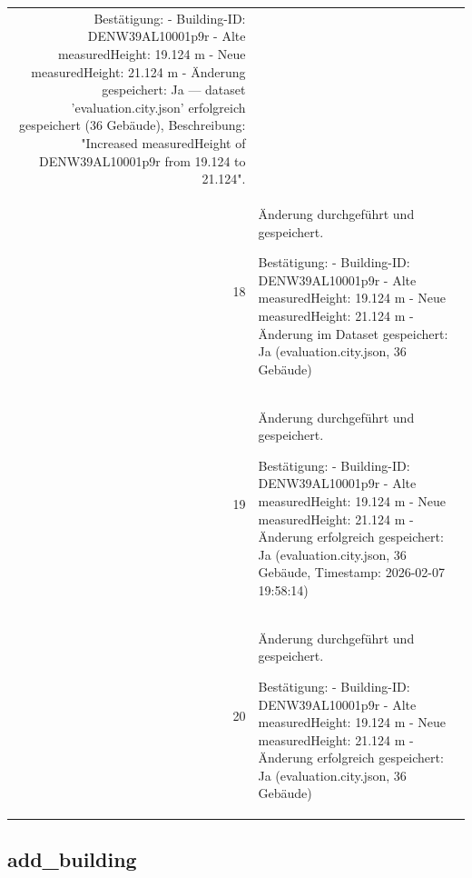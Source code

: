 \documentclass[a4paper,11pt]{article}
\begin{document}
\begin{table}[ht]
\begin{tabular}{r p{12cm}}
Bestätigung:
- Building-ID: DENW39AL10001p9r
- Alte measuredHeight: 19.124 m
- Neue measuredHeight: 21.124 m
- Änderung gespeichert: Ja — dataset 'evaluation.city.json' erfolgreich gespeichert (36 Gebäude), Beschreibung: "Increased measuredHeight of DENW39AL10001p9r from 19.124 to 21.124". \\
18 & Änderung durchgeführt und gespeichert.

Bestätigung:
- Building-ID: DENW39AL10001p9r
- Alte measuredHeight: 19.124 m
- Neue measuredHeight: 21.124 m
- Änderung im Dataset gespeichert: Ja (evaluation.city.json, 36 Gebäude) \\
19 & Änderung durchgeführt und gespeichert.

Bestätigung:
- Building-ID: DENW39AL10001p9r
- Alte measuredHeight: 19.124 m
- Neue measuredHeight: 21.124 m
- Änderung erfolgreich gespeichert: Ja (evaluation.city.json, 36 Gebäude, Timestamp: 2026-02-07 19:58:14) \\
20 & Änderung durchgeführt und gespeichert.

Bestätigung:
- Building-ID: DENW39AL10001p9r
- Alte measuredHeight: 19.124 m
- Neue measuredHeight: 21.124 m
- Änderung erfolgreich gespeichert: Ja (evaluation.city.json, 36 Gebäude) \\
\hline
\end{tabular}
\end{table}

\clearpage
\subsection{add\_building}
\end{document}
